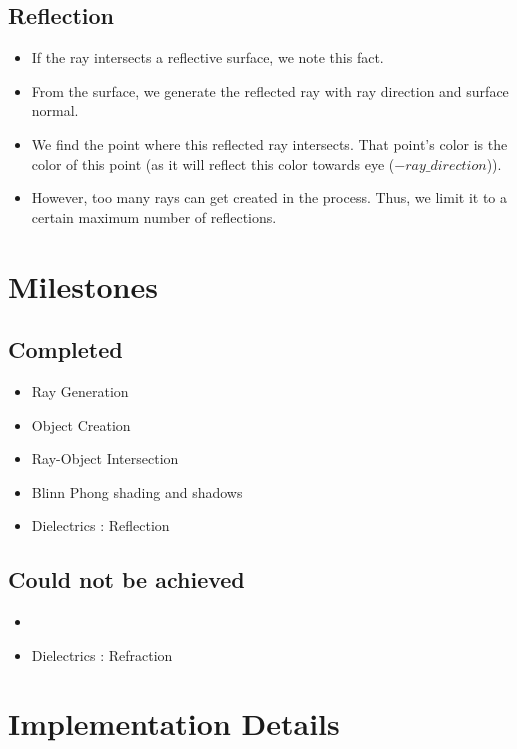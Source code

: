 \documentclass[a4paper]{article}
\begin{document}
\subsection{Reflection}
\begin{itemize}
    \item If the ray intersects a reflective surface, we note this fact.
    \item From the surface, we generate the reflected ray with ray direction and surface normal.
    \item We find the point where this reflected ray intersects. That point's color is the color 
    of this point (as it will reflect this color towards eye ($-ray\_direction$)).
    \item However, too many rays can get created in the process. Thus, we limit it to a 
    certain maximum number of reflections.
\end{itemize}

\bigskip

\section{Milestones}
\subsection{Completed}
\begin{itemize}
    \item Ray Generation
    \item Object Creation
    \item Ray-Object Intersection
    \item Blinn Phong shading and shadows 
    \item Dielectrics : Reflection 
\end{itemize}

\subsection{Could not be achieved}
\begin{itemize}
    \item \item Dielectrics : Refraction
\end{itemize}

\bigskip

\section{Implementation Details}
\end{document}
